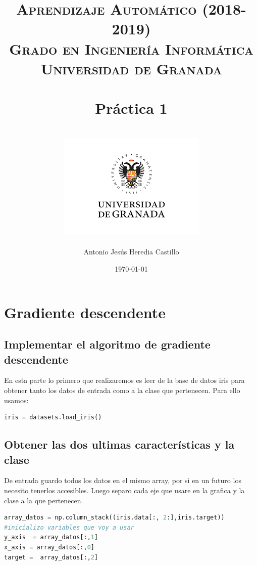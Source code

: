 \documentclass[12pt,a4paper]{article}
\title{
\normalfont \normalsize 
\textsc{{\bf Aprendizaje Automático (2018-2019)} \\ Grado en Ingeniería Informática \\ Universidad de Granada} \\ [25pt] %
\horrule{0.5pt} \\[0.4cm] %
\huge Práctica 1 \\ %
\horrule{2pt} \\[0.5cm] %
\includegraphics{images/logo.png}	
}
\author{Antonio Jesús Heredia Castillo} %
\date{\normalsize\today} %
\begin{document}
\maketitle %
\newpage %
\tableofcontents %
\listoffigures
\newpage

\section{Gradiente descendente}
\subsection{Implementar el algoritmo de gradiente descendente}
En esta parte lo primero que realizaremos es leer de la base de datos iris para obtener tanto los datos de entrada como a la clase que pertenecen. Para ello usamos:
\begin{lstlisting}[language=Python]
iris = datasets.load_iris()
\end{lstlisting}
\subsection{Obtener las dos ultimas características y la clase}
De entrada guardo todos los datos en el mismo array, por si en un futuro los necesito tenerlos accesibles. Luego separo cada eje que usare en la grafica y la clase a la que pertenecen.
\begin{lstlisting}[language=Python]
array_datos = np.column_stack((iris.data[:, 2:],iris.target))
#inicializo variables que voy a usar
y_axis  = array_datos[:,1]
x_axis = array_datos[:,0]
target =  array_datos[:,2]\end{lstlisting}
\end{document}
